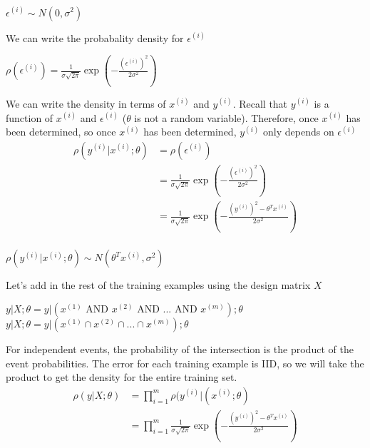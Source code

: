 \documentclass{article}
\begin{document}
\begin{center}
$\epsilon^{(i)} \sim N(0,\sigma^2)$\\
\end{center}

We can write the probabality density for $\epsilon^{(i)}$
\begin{center}
$\rho(\epsilon^{(i)}) = \frac{1}{\sigma\sqrt{2\pi}} \exp(-\frac{(\epsilon^{(i)})^2}{2\sigma^2})$\\
\end{center}

We can write the density in terms of $x^{(i)}$ and $y^{(i)}$. Recall that $y^{(i)}$ is a function of $x^{(i)}$ and $\epsilon^{(i)}$ ($\theta$ is not a random variable). Therefore, once $x^{(i)}$ has been determined, so once $x^{(i)}$ has been determined, $y^{(i)}$ only depends on $\epsilon^{(i)}$\\
\begin{align*}
\rho(y^{(i)}|x^{(i)} ; \theta) &= \rho(\epsilon^{(i)})\\
&= \frac{1}{\sigma\sqrt{2\pi}} \exp(-\frac{(\epsilon^{(i)})^2}{2\sigma^2})\\
&= \frac{1}{\sigma\sqrt{2\pi}} \exp(-\frac{(y^{(i)})^2-\theta^Tx^{(i)}}{2\sigma^2})\\
\end{align*}

\begin{center}
$\rho(y^{(i)}|x^{(i)} ; \theta) \sim N(\theta^Tx^{(i)}, \sigma^2)$\\
\end{center}

Let's add in the rest of the training examples using the design matrix $X$
\begin{center}
$y|X ; \theta = y|(x^{(1)} \text{ AND } x^{(2)} \text{ AND } ... \text{ AND } x^{(m)}) ; \theta $\\
$y|X ; \theta = y|(x^{(1)} \cap x^{(2)} \cap ... \cap x^{(m)}) ; \theta $\\
\end{center}

For independent events, the probability of the intersection is the product of the event probabilities. The error for each training example is IID, so we will take the product to get the density for the entire training set.
\begin{align*}
\rho(y|X ; \theta) &= \prod_{i=1}^m \rho(y^{(i)}|(x^{(i)};\theta)\\
&=\prod_{i=1}^m \frac{1}{\sigma\sqrt{2\pi}} \exp(-\frac{(y^{(i)})^2-\theta^Tx^{(i)}}{2\sigma^2})\\
\end{align*}
\end{document}
